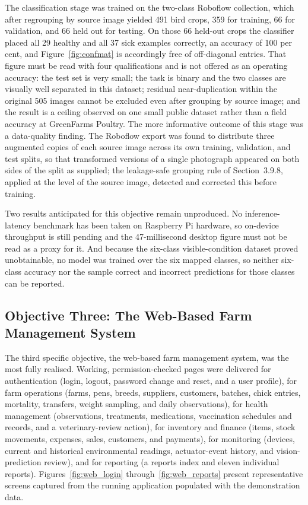 \documentclass[12pt,a4paper]{report}
\begin{document}
The classification stage was trained on the two-class Roboflow collection, which after regrouping by source image yielded 491 bird crops, 359 for training, 66 for validation, and 66 held out for testing. On those 66 held-out crops the classifier placed all 29 healthy and all 37 sick examples correctly, an accuracy of 100 per cent, and Figure~\ref{fig:confmat} is accordingly free of off-diagonal entries. That figure must be read with four qualifications and is not offered as an operating accuracy: the test set is very small; the task is binary and the two classes are visually well separated in this dataset; residual near-duplication within the original 505 images cannot be excluded even after grouping by source image; and the result is a ceiling observed on one small public dataset rather than a field accuracy at GreenFarms Poultry. The more informative outcome of this stage was a data-quality finding. The Roboflow export was found to distribute three augmented copies of each source image across its own training, validation, and test splits, so that transformed versions of a single photograph appeared on both sides of the split as supplied; the leakage-safe grouping rule of Section~3.9.8, applied at the level of the source image, detected and corrected this before training.

Two results anticipated for this objective remain unproduced. No inference-latency benchmark has been taken on Raspberry Pi hardware, so on-device throughput is still pending and the 47-millisecond desktop figure must not be read as a proxy for it. And because the six-class visible-condition dataset proved unobtainable, no model was trained over the six mapped classes, so neither six-class accuracy nor the sample correct and incorrect predictions for those classes can be reported.

\subsection{Objective Three: The Web-Based Farm Management System}

The third specific objective, the web-based farm management system, was the most fully realised. Working, permission-checked pages were delivered for authentication (login, logout, password change and reset, and a user profile), for farm operations (farms, pens, breeds, suppliers, customers, batches, chick entries, mortality, transfers, weight sampling, and daily observations), for health management (observations, treatments, medications, vaccination schedules and records, and a veterinary-review action), for inventory and finance (items, stock movements, expenses, sales, customers, and payments), for monitoring (devices, current and historical environmental readings, actuator-event history, and vision-prediction review), and for reporting (a reports index and eleven individual reports). Figures~\ref{fig:web_login} through~\ref{fig:web_reports} present representative screens captured from the running application populated with the demonstration data.
\end{document}
